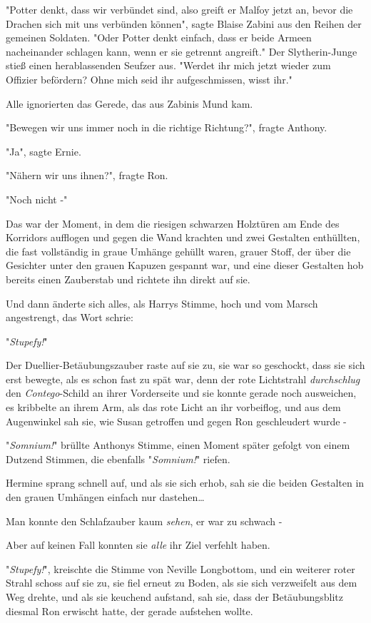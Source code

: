 {"Potter denkt, dass wir verbündet sind, also greift er Malfoy jetzt an, bevor die Drachen sich mit uns verbünden können", sagte Blaise Zabini aus den Reihen der gemeinen Soldaten. "Oder Potter denkt einfach, dass er beide Armeen nacheinander schlagen kann, wenn er sie getrennt angreift." Der Slytherin-Junge stieß einen herablassenden Seufzer aus. "Werdet ihr mich jetzt wieder zum Offizier befördern? Ohne mich seid ihr aufgeschmissen, wisst ihr."

Alle ignorierten das Gerede, das aus Zabinis Mund kam.

"Bewegen wir uns immer noch in die richtige Richtung?", fragte Anthony.

"Ja", sagte Ernie.

"Nähern wir uns ihnen?", fragte Ron.

"Noch nicht -"

Das war der Moment, in dem die riesigen schwarzen Holztüren am Ende des Korridors aufflogen und gegen die Wand krachten und zwei Gestalten enthüllten, die fast vollständig in graue Umhänge gehüllt waren, grauer Stoff, der über die Gesichter unter den grauen Kapuzen gespannt war, und eine dieser Gestalten hob bereits einen Zauberstab und richtete ihn direkt auf sie.

Und dann änderte sich alles, als Harrys Stimme, hoch und vom Marsch angestrengt, das Wort schrie:

"\emph{Stupefy!}"

Der Duellier-Betäubungszauber raste auf sie zu, sie war so geschockt, dass sie sich erst bewegte, als es schon fast zu spät war, denn der rote Lichtstrahl \emph{durchschlug} den \emph{Contego}-Schild an ihrer Vorderseite und sie konnte gerade noch ausweichen, es kribbelte an ihrem Arm, als das rote Licht an ihr vorbeiflog, und aus dem Augenwinkel sah sie, wie Susan getroffen und gegen Ron geschleudert wurde -

"\emph{Somnium!}" brüllte Anthonys Stimme, einen Moment später gefolgt von einem Dutzend Stimmen, die ebenfalls "\emph{Somnium!}" riefen.

Hermine sprang schnell auf, und als sie sich erhob, sah sie die beiden Gestalten in den grauen Umhängen einfach nur dastehen…

Man konnte den Schlafzauber kaum \emph{sehen}, er war zu schwach -

Aber auf keinen Fall konnten sie \emph{alle} ihr Ziel verfehlt haben.

"\emph{Stupefy!}", kreischte die Stimme von Neville Longbottom, und ein weiterer roter Strahl schoss auf sie zu, sie fiel erneut zu Boden, als sie sich verzweifelt aus dem Weg drehte, und als sie keuchend aufstand, sah sie, dass der Betäubungsblitz diesmal Ron erwischt hatte, der gerade aufstehen wollte.

}
